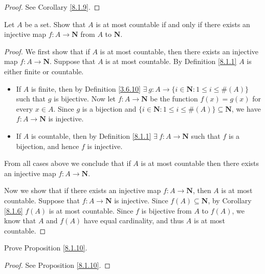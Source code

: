\begin{proof}
    See Corollary \ref{8.1.9}.
\end{proof}

\begin{exercise}\label{ex 8.1.6}
    Let \(A\) be a set.
    Show that \(A\) is at most countable if and only if there exists an injective map \(f : A \to \mathbf{N}\) from \(A\) to \(\mathbf{N}\).
\end{exercise}

\begin{proof}
    We first show that if \(A\) is at most countable, then there exists an injective map \(f : A \to \mathbf{N}\).
    Suppose that \(A\) is at most countable.
    By Definition \ref{8.1.1} \(A\) is either finite or countable.
    \begin{itemize}
        \item If \(A\) is finite, then by Definition \ref{3.6.10} \(\exists\ g : A \to \{i \in \mathbf{N} : 1 \leq i \leq \#(A)\}\) such that \(g\) is bijective.
              Now let \(f : A \to \mathbf{N}\) be the function \(f(x) = g(x)\) for every \(x \in A\).
              Since \(g\) is a bijection and \(\{i \in \mathbf{N} : 1 \leq i \leq \#(A)\} \subseteq \mathbf{N}\), we have \(f : A \to \mathbf{N}\) is injective.
        \item If \(A\) is countable, then by Definition \ref{8.1.1} \(\exists\ f : A \to \mathbf{N}\) such that \(f\) is a bijection, and hence \(f\) is injective.
    \end{itemize}
    From all cases above we conclude that if \(A\) is at most countable then there exists an injective map \(f : A \to \mathbf{N}\).

    Now we show that if there exists an injective map \(f : A \to \mathbf{N}\), then \(A\) is at most countable.
    Suppose that \(f : A \to \mathbf{N}\) is injective.
    Since \(f(A) \subseteq \mathbf{N}\), by Corollary \ref{8.1.6} \(f(A)\) is at most countable.
    Since \(f\) is bijective from \(A\) to \(f(A)\), we know that \(A\) and \(f(A)\) have equal cardinality, and thus \(A\) is at most countable.
\end{proof}

\begin{exercise}\label{ex 8.1.7}
    Prove Proposition \ref{8.1.10}.
\end{exercise}

\begin{proof}
    See Proposition \ref{8.1.10}.
\end{proof}

